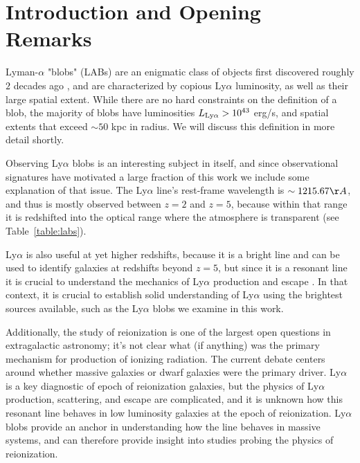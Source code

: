 \chapter{Introduction and Opening Remarks}
\label{sec:intro}

Lyman-$\alpha$ "blobs" (LABs) are an enigmatic class of objects first discovered roughly $2$ decades ago \citep{Fynbo1999,Steidel2000}, and are characterized by copious Ly$\alpha$ luminosity, as well as their large spatial extent.
While there are no hard constraints on the definition of a blob, the majority of blobs have luminosities $L_{\rm{Ly}\alpha} > 10^{43}$ erg/s, and spatial extents that exceed $\sim50$ kpc in radius.
We will discuss this definition in more detail shortly.

Observing Ly$\alpha$ blobs is an interesting subject in itself, and since observational signatures have motivated a large fraction of this work we include some explanation of that issue.
The Ly$\alpha$ line's rest-frame wavelength is $\sim 1215.67 \AA$, and thus is mostly observed between $z=2$ and $z=5$, because within that range it is redshifted into the optical range where the atmosphere is transparent (see Table~\ref{table:labs}).

Ly$\alpha$ is also useful at yet higher redshifts, because it is a bright line and can be used to identify galaxies at redshifts beyond $z=5$, but since it is a resonant line it is crucial to understand the mechanics of Ly$\alpha$ production and escape \citep{Ao2015}.
In that context, it is crucial to establish solid understanding of Ly$\alpha$ using the brightest sources available, such as the Ly$\alpha$ blobs we examine in this work.

Additionally, the study of reionization is one of the largest open questions in extragalactic astronomy; it's not clear what (if anything) was the primary mechanism for production of ionizing radiation.
The current debate centers around whether massive galaxies \citep{Naidu2019} or dwarf galaxies \citep{Finkelstein2019} were the primary driver.
Ly$\alpha$ is a key diagnostic of epoch of reionization galaxies, but the physics of Ly$\alpha$ production, scattering, and escape are complicated, and it is unknown how this resonant line behaves in low luminosity galaxies at the epoch of reionization.
Ly$\alpha$ blobs provide an anchor in understanding how the line behaves in massive systems, and can therefore provide insight into studies probing the physics of reionization.

